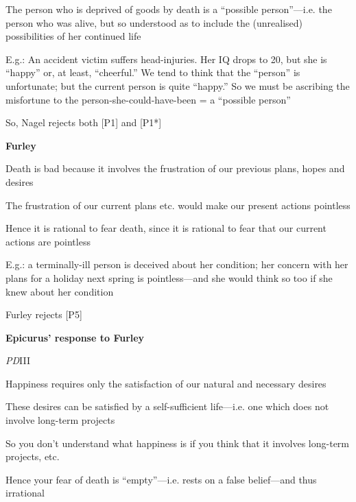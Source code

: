 \documentclass[11pt]{article}
\begin{document}
\noindent [3] The person who is deprived of goods by death is a ``possible person''---i.e. the person who was alive, but so understood as to include the (unrealised) possibilities of her continued life
\vspace*{1mm}

\noindent E.g.: An accident victim suffers head-injuries. Her IQ drops to 20, but she is ``happy'' or, at least, ``cheerful.'' We tend to think that the ``person'' is unfortunate; but the current person is quite ``happy.'' So we must be ascribing the misfortune to the person-she-could-have-been = a ``possible person''
\vspace*{2mm}

\noindent So, Nagel rejects both [P1] and [P1*]
\vspace*{5mm}

\noindent \textbf{Furley}
\vspace*{2mm}

\noindent [1] Death is bad because it involves the frustration of our previous plans, hopes and desires
\vspace*{1mm}

\noindent [2] The frustration of our current plans etc. would make our present actions pointless
\vspace*{1mm}

\noindent [3] Hence it is rational to fear death, since it is rational to fear that our current actions are pointless
\vspace*{1mm}

\noindent E.g.: a terminally-ill person is deceived about her condition; her concern with her plans for a holiday next spring is pointless---and she would think so too if she knew about her condition
\vspace*{2mm}

\noindent Furley rejects [P5]
\vspace*{5mm}

\noindent \textbf{Epicurus' response to Furley}
\vspace*{2mm}

\noindent \emph{PD}III
\vspace*{1mm}

\noindent [1] Happiness requires only the satisfaction of our natural and necessary desires
\vspace*{1mm}

\noindent [2] These desires can be satisfied by a self-sufficient life---i.e. one which does not involve long-term projects
\vspace*{1mm}

\noindent [3] So you don't understand what happiness is if you think that it involves long-term projects, etc.
\vspace*{1mm}

\noindent [4] Hence your fear of death is ``empty''---i.e. rests on a false belief---and thus irrational
\end{document}

